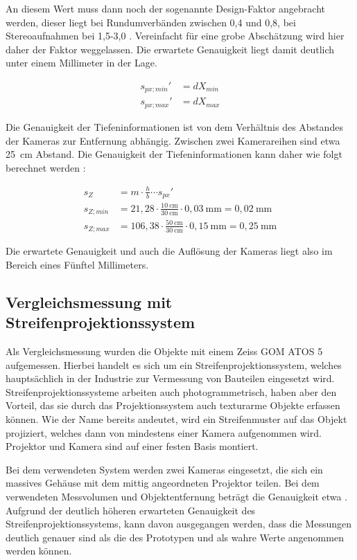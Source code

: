\documentclass[./00PhotoBox.tex]{subfiles}
\begin{document}
An diesem Wert muss dann noch der sogenannte Design-Faktor angebracht werden, dieser liegt bei Rundumverbänden zwischen 0,4 und 0,8, bei Stereoaufnahmen bei 1,5-3,0 \citep[S. 174]{luhmann}. Vereinfacht für eine grobe Abschätzung wird hier daher der Faktor weggelassen. Die erwartete Genauigkeit liegt damit deutlich unter einem Millimeter in der Lage.

\begin{align}
    s_{px; min}' & = dX_{min} \\
    s_{px; max}' & = dX_{max}
\end{align}

Die Genauigkeit der Tiefeninformationen ist von dem Verhältnis des Abstandes der Kameras zur Entfernung abhängig. Zwischen zwei Kamerareihen sind etwa 25~cm Abstand. Die Genauigkeit der Tiefeninformationen kann daher wie folgt berechnet werden \citep[S. 174]{luhmann}:

\begin{align}
    s_Z       & = m \cdot \frac{h}{b} \cdots s_{px}'                                                   \\
    s_{Z;min} & = 21,28 \cdot \frac{10~\text{cm}}{30~\text{cm}}\cdot 0,03~\text{mm}  = 0,02~\text{mm}  \\
    s_{Z;max} & = 106,38 \cdot \frac{50~\text{cm}}{30~\text{cm}} \cdot 0,15~\text{mm} = 0,25~\text{mm}
\end{align}

Die erwartete Genauigkeit und auch die Auflösung der Kameras liegt also im Bereich eines Fünftel Millimeters.


\subsection{Vergleichsmessung mit Streifenprojektionssystem}
Als Vergleichsmessung wurden die Objekte mit einem Zeiss GOM ATOS 5 aufgemessen. Hierbei handelt es sich um ein Streifenprojektionssystem, welches hauptsächlich in der Industrie zur Vermessung von Bauteilen eingesetzt wird. Streifenprojektionssysteme arbeiten auch photogrammetrisch, haben aber den Vorteil, das sie durch das Projektionssystem auch texturarme Objekte erfassen können. Wie der Name bereits andeutet, wird ein Streifenmuster auf das Objekt projiziert, welches dann von mindestens einer Kamera aufgenommen wird. Projektor und Kamera sind auf einer festen Basis montiert. \citep[S. 581f]{luhmann}

Bei dem verwendeten System werden zwei Kameras eingesetzt, die sich ein massives Gehäuse mit dem mittig angeordneten Projektor teilen. Bei dem verwendeten Messvolumen und Objektentfernung beträgt die Genauigkeit etwa . Aufgrund der deutlich höheren erwarteten Genauigkeit des Streifenprojektionssystems, kann davon ausgegangen werden, dass die Messungen deutlich genauer sind als die des Prototypen und als wahre Werte angenommen werden können.
\end{document}
